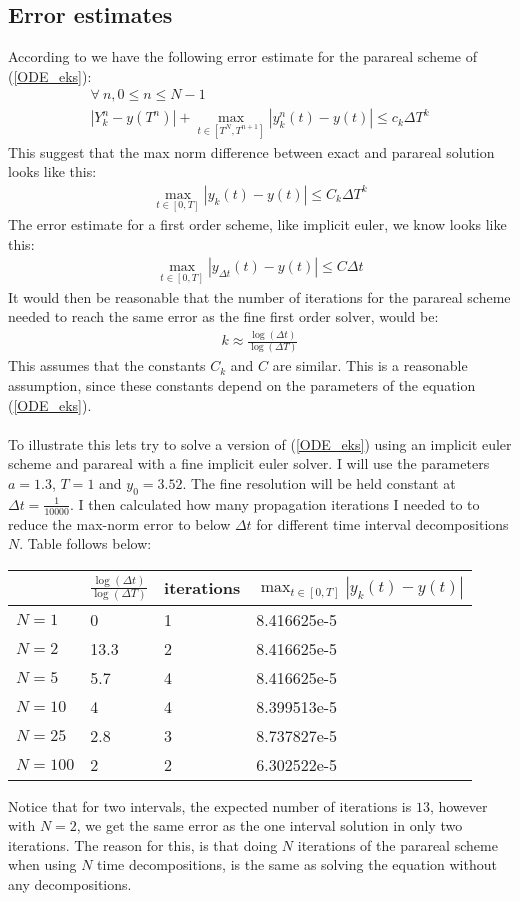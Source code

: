 \subsection{Error estimates}
According to \cite{lions2001resolution} we have the following error estimate for the parareal scheme of (\ref{ODE_eks}):
\begin{gather*}
\forall \ n,0\leq n\leq N-1 \\ |Y_k^n-y(T^n)| + \max_{t\in[T^N,T^{n+1}]}|y_k^n(t)-y(t)| \leq c_k\Delta T^k
\end{gather*} 
This suggest that the max norm difference between exact and parareal solution looks like this:
\begin{align*}
\max_{t\in[0,T]}|y_k(t)-y(t)| \leq C_k\Delta T^k
\end{align*}
The error estimate for a first order scheme, like implicit euler, we know looks like this:
\begin{align*}
\max_{t\in[0,T]}|y_{\Delta t}(t)-y(t)| \leq C\Delta t
\end{align*}
It would then be reasonable that the number of iterations for the parareal scheme needed to reach the same error as the fine first order solver, would be:
\begin{align*}
k\approx\frac{\log(\Delta t)}{\log(\Delta T)}
\end{align*}
This assumes that the constants $C_k$ and $C$ are similar. This is a reasonable assumption, since these constants depend on the parameters of the equation (\ref{ODE_eks}). 
\\
\\
To illustrate this lets try to solve a version of (\ref{ODE_eks}) using an implicit euler scheme and parareal with a fine implicit euler solver. I will use  the parameters $a=1.3$, $T=1$ and $y_0= 3.52$. The fine resolution will be held constant at $\Delta t=\frac{1}{10000}$. I then calculated how many propagation iterations I needed to to reduce the max-norm error to below $\Delta t$ for different time interval decompositions $N$. Table follows below:
 \begin{center}
    \begin{tabular}{| l | l | l | l |}
    \hline
     & $\frac{\log(\Delta t)}{\log(\Delta T)}$&iterations  & $\max_{t\in[0,T]}|y_k(t)-y(t)|$   \\ \hline
    $N=1$ &0 & 1& 8.416625e-5 	\\ \hline
    $N=2$ &13.3 &2& 8.416625e-5 	\\ \hline
    $N=5$ &5.7&4& 8.416625e-5	\\ \hline
    $N=10$ &4&4& 8.399513e-5	\\ \hline
    $N=25$ &2.8&3& 	8.737827e-5\\ \hline
    $N=100$ &2&2&	6.302522e-5\\ \hline
    \end{tabular}
\end{center}
Notice that for two intervals, the expected number of iterations is $13$, however with $N=2$, we get the same error as the one interval solution in only two iterations. The reason for this, is that doing $N$ iterations of the parareal scheme when using $N$ time decompositions, is the same as solving the equation without any decompositions. 